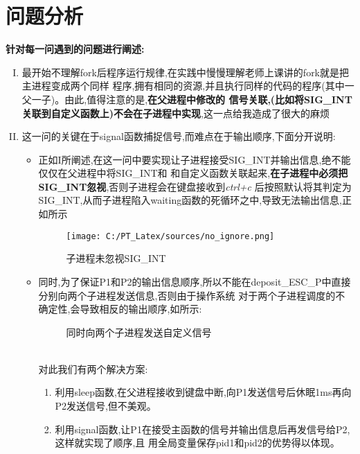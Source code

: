 \documentclass[UTF8]{ctexart}
\begin{document}
\section{问题分析}
\textbf{针对每一问遇到的问题进行阐述:}
\begin{enumerate}[I.]
    \item 最开始不理解fork后程序运行规律,在实践中慢慢理解老师上课讲的fork就是把主进程变成两个同样
    程序,拥有相同的资源,并且执行同样的代码的程序(其中一父一子)。由此,值得注意的是,\textbf{在父进程中修改的
    信号关联,(比如将SIG\_INT关联到自定义函数上)不会在子进程中实现},这一点给我造成了很大的麻烦
    \item 这一问的关键在于signal函数捕捉信号,而难点在于输出顺序,下面分开说明: 
    \begin{itemize}
        \item 正如I所阐述,在这一问中要实现让子进程接受SIG\_INT并输出信息,绝不能仅仅在父进程中将SIG\_INT和
        和自定义函数关联起来,\textbf{在子进程中必须把SIG\_INT忽视},否则子进程会在键盘接收到\emph{ctrl+c}
        后按照默认将其判定为SIG\_INT,从而子进程陷入waiting函数的死循环之中,导致无法输出信息,正如所示
        
        \begin{figure}[htb]
            \centering        
            \caption{子进程未忽视SIG\_INT}
            \label{fig_1}
            \texttt{[image: C:/PT\_Latex/sources/no\_ignore.png]}
        \end{figure}
        
        \item 同时,为了保证P1和P2的输出信息顺序,所以不能在deposit\_ESC\_P中直接分别向两个子进程发送信息,否则由于操作系统
        对于两个子进程调度的不确定性,会导致相反的输出顺序,如所示:
        \begin{figure}[htb]
            \centering
            \caption{同时向两个子进程发送自定义信号}
            \label{fig_2}
        \end{figure}
        \\
        对此我们有两个解决方案:
        \begin{enumerate}
            \item 利用sleep函数,在父进程接收到键盘中断,向P1发送信号后休眠1ms再向P2发送信号,但不美观。
            \item 利用signal函数,让P1在接受主函数的信号并输出信息后再发信号给P2,这样就实现了顺序,且
            用全局变量保存pid1和pid2的优势得以体现。
        \end{enumerate}
    \end{itemize}


\end{enumerate}
\end{document}
